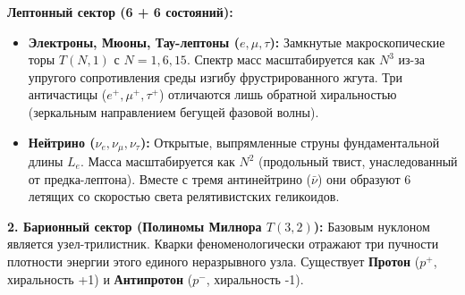 \documentclass[11pt,a4paper]{article}
\begin{document}
\textbf{Лептонный сектор (6 + 6 состояний):}
\begin{itemize}
    \item \textbf{Электроны, Мюоны, Тау-лептоны ($e, \mu, \tau$):} Замкнутые макроскопические торы $T(N,1)$ с $N = 1, 6, 15$. Спектр масс масштабируется как $N^3$ из-за упругого сопротивления среды изгибу фрустрированного жгута. Три античастицы ($e^+, \mu^+, \tau^+$) отличаются лишь обратной хиральностью (зеркальным направлением бегущей фазовой волны).
    \item \textbf{Нейтрино ($\nu_e, \nu_\mu, \nu_\tau$):} Открытые, выпрямленные струны фундаментальной длины $L_e$. Масса масштабируется как $N^2$ (продольный твист, унаследованный от предка-лептона). Вместе с тремя антинейтрино ($\bar{\nu}$) они образуют 6 летящих со скоростью света релятивистских геликоидов.
\end{itemize}

\textbf{2. Барионный сектор (Полиномы Милнора $T(3,2)$):}
Базовым нуклоном является узел-трилистник. Кварки феноменологически отражают три пучности плотности энергии этого единого неразрывного узла. Существует \textbf{Протон} ($p^+$, хиральность +1) и \textbf{Антипротон} ($p^-$, хиральность -1).
\end{document}
